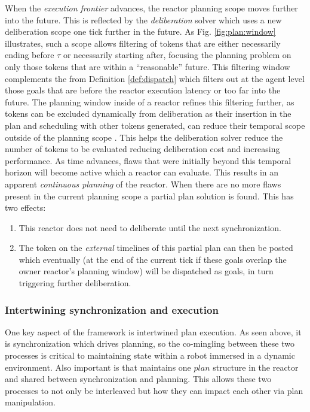 When the {\em execution frontier} advances, the reactor planning scope
moves further into the future. This is reflected by the {\em
  deliberation} solver which uses a new deliberation scope one tick
further in the future. As Fig. \ref{fig:plan:window} illustrates, such
a scope allows filtering of tokens that are either necessarily ending
before $\tau$ or necessarily starting after, focusing the planning
problem on only those tokens that are within a ``reasonable'' future.
This filtering window complements the  from Definition \ref{def:dispatch} which filters out at the
agent level those goals that are before the reactor execution latency
or too far into the future. The planning window inside of a reactor
refines this filtering further, as tokens can be excluded dynamically
from deliberation as their insertion in the plan and scheduling with
other tokens generated, can reduce their temporal scope outside of the
planning scope . This
helps the deliberation solver reduce the number of tokens to be
evaluated reducing deliberation cost and increasing performance. As
time advances, flaws that were initially beyond this temporal horizon
will become active which a reactor can evaluate. This results in an
apparent \emph{continuous planning} of the reactor. When there are no
more flaws present in the current planning scope a partial plan
solution is found. This has two effects:

\begin{enumerate}

\item This reactor does not need to deliberate until the next
  synchronization. 

\item The token on the {\em external} timelines of this partial plan
  can then be posted which eventually (at the end of the current tick
  if these goals overlap the owner reactor's planning window) will be
  dispatched as goals, in turn triggering further deliberation.

\end{enumerate}


\subsubsection{Intertwining synchronization and execution}
\label{sec:arch:intertwine}

One key aspect of the \rx framework is intertwined plan execution. As
seen above, it is synchronization which drives planning, so the
co-mingling between these two processes is critical to maintaining
state within a robot immersed in a dynamic environment. Also important
is that \rx maintains 
one $plan$ structure in the reactor and shared between synchronization
and planning. This allows these two processes to not only be
interleaved but how they can impact each other via plan manipulation.

